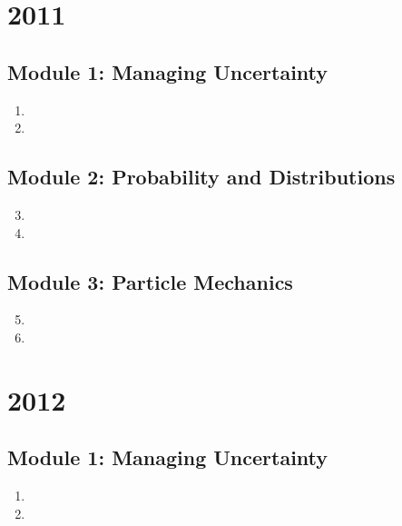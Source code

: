 \documentclass[fleqn,titlepage]{book}
\numberwithin{equation}{section}
\theoremstyle{plain}
\theoremstyle{definition}
\theoremstyle{remark}
\begin{document}
\chapter{2011}
\section{Module 1: Managing Uncertainty}
\begin{enumerate}[label=\bfseries  \arabic*.]\setcounter{enumi}{0}
\item 
\item 
\end{enumerate}
\section{Module 2: Probability and Distributions}
\begin{enumerate}[label=\bfseries  \arabic*.]\setcounter{enumi}{2}
\item 
\item 
\end{enumerate}
\section{Module 3: Particle Mechanics}
\begin{enumerate}[label=\bfseries  \arabic*.]\setcounter{enumi}{4}
\item 
\item 
\end{enumerate}

\chapter{2012}
\section{Module 1: Managing Uncertainty}
\begin{enumerate}[label=\bfseries  \arabic*.]\setcounter{enumi}{0}
\item 
\item 
\end{enumerate}
\end{document}
